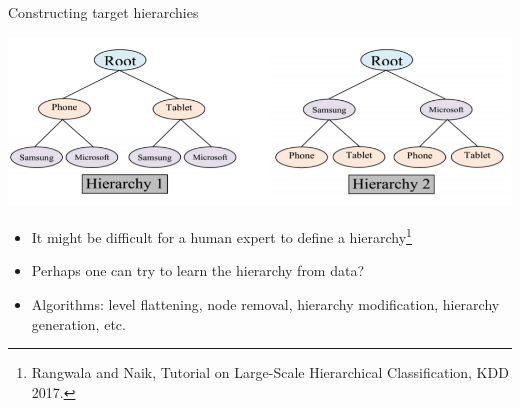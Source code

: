 \documentclass[]{beamer}
\begin{document}
\begin{frame}{Constructing target hierarchies}

\includegraphics[width=\textwidth]{pics/hierarchies}

\begin{itemize}
\item It might be difficult for a human expert to define a hierarchy\footnote{Rangwala and Naik, Tutorial on Large-Scale Hierarchical Classification, KDD 2017.}
\item Perhaps one can try to learn the hierarchy from data? 
\item Algorithms: level flattening, node removal, hierarchy modification, hierarchy generation, etc.
\end{itemize}


\end{frame}
\end{document}
